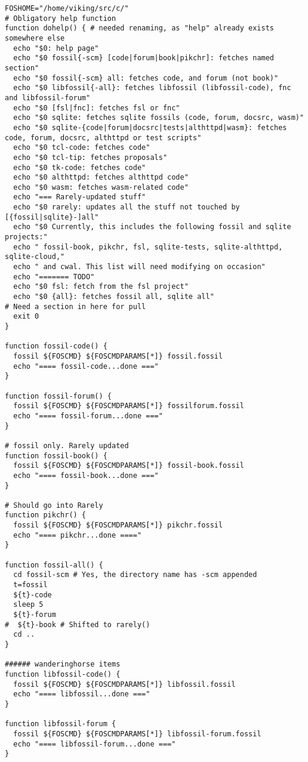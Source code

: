 \documentclass[11pt]{article}
\begin{document}
\begin{verbatim}
FOSHOME="/home/viking/src/c/"
# Obligatory help function
function dohelp() { # needed renaming, as "help" already exists somewhere else
  echo "$0: help page"
  echo "$0 fossil{-scm} [code|forum|book|pikchr]: fetches named section"
  echo "$0 fossil{-scm} all: fetches code, and forum (not book)"
  echo "$0 libfossil{-all}: fetches libfossil (libfossil-code), fnc and libfossil-forum"
  echo "$0 [fsl|fnc]: fetches fsl or fnc"
  echo "$0 sqlite: fetches sqlite fossils (code, forum, docsrc, wasm)"
  echo "$0 sqlite-{code|forum|docsrc|tests|althttpd|wasm}: fetches code, forum, docsrc, althttpd or test scripts"
  echo "$0 tcl-code: fetches code"
  echo "$0 tcl-tip: fetches proposals"
  echo "$0 tk-code: fetches code"
  echo "$0 althttpd: fetches althttpd code"
  echo "$0 wasm: fetches wasm-related code"
  echo "=== Rarely-updated stuff"
  echo "$0 rarely: updates all the stuff not touched by [{fossil|sqlite}-]all"
  echo "$0 Currently, this includes the following fossil and sqlite projects:"
  echo " fossil-book, pikchr, fsl, sqlite-tests, sqlite-althttpd, sqlite-cloud,"
  echo " and cwal. This list will need modifying on occasion"
  echo "======= TODO"
  echo "$0 fsl: fetch from the fsl project"
  echo "$0 {all}: fetches fossil all, sqlite all"
# Need a section in here for pull
  exit 0
}

function fossil-code() {
  fossil ${FOSCMD} ${FOSCMDPARAMS[*]} fossil.fossil
  echo "==== fossil-code...done ==="
}

function fossil-forum() {
  fossil ${FOSCMD} ${FOSCMDPARAMS[*]} fossilforum.fossil 
  echo "==== fossil-forum...done ==="
}

# fossil only. Rarely updated  
function fossil-book() {
  fossil ${FOSCMD} ${FOSCMDPARAMS[*]} fossil-book.fossil 
  echo "==== fossil-book...done ==="
}

# Should go into Rarely
function pikchr() {
  fossil ${FOSCMD} ${FOSCMDPARAMS[*]} pikchr.fossil
  echo "==== pikchr...done ===="
}

function fossil-all() {
  cd fossil-scm # Yes, the directory name has -scm appended
  t=fossil
  ${t}-code
  sleep 5
  ${t}-forum
#  ${t}-book # Shifted to rarely()
  cd ..
}

###### wanderinghorse items
function libfossil-code() {
  fossil ${FOSCMD} ${FOSCMDPARAMS[*]} libfossil.fossil
  echo "==== libfossil...done ==="
}

function libfossil-forum {
  fossil ${FOSCMD} ${FOSCMDPARAMS[*]} libfossil-forum.fossil
  echo "==== libfossil-forum...done ==="
}


\end{verbatim}
\end{document}

